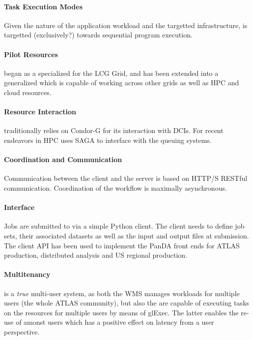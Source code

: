 \documentclass{sig-alternate}
\begin{document}
\paragraph{Task Execution Modes}

Given the nature of the application workload and the targetted infrastructure,
\panda is targetted (exclusively?) towards sequential program execution.

\paragraph{Pilot Resources}

\panda began as a specialized \pilot for the LCG Grid, and has been
extended into a generalized \pilot which is capable of working across other
grids as well as HPC\cite{} and cloud\cite{} resources.

\paragraph{Resource Interaction}

\panda traditionally relies on Condor-G for its interaction with DCIs.
For recent endeavors in HPC \panda uses SAGA to interface with the queuing
systems.

\paragraph{Coordination and Communication}

Communication between the client and the server is based on HTTP/S RESTful
communication.
Coordination of the workflow is maximally asynchronous.

\paragraph{Interface}

Jobs are submitted to \panda via a simple Python client.
The client needs to define job sets, their associated datasets as well as
the input and output files at submission.
The client API has been used to implement the PanDA front ends for ATLAS
production, distributed analysis and US regional production.

\paragraph{Multitenancy}

\panda is a \textit{true} multi-user system, as both the WMS manages workloads
for multiple users (the whole ATLAS community), but also the \pilots are
capable of executing tasks on the resources for multiple users by means of
glExec\cite{}.
The latter enables the re-use of \pilots amonst users which has a positive
effect on latency from a user perspective.
\end{document}
